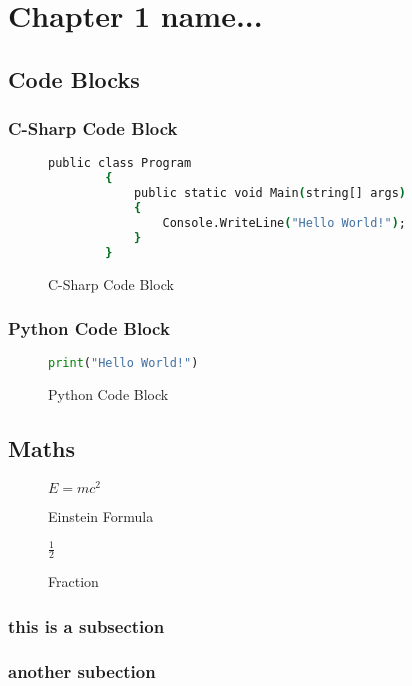 \chapter{Chapter 1 name...}


\section{Code Blocks}

\subsection{C-Sharp Code Block}

\begin{figure}[ht]
    \centering
    \begin{lstlisting}[language=csh]
        public class Program
        {
            public static void Main(string[] args)
            {
                Console.WriteLine("Hello World!");
            }
        }
    \end{lstlisting}
    \caption{C-Sharp Code Block}
    \label{fig:CSharpCodeBlock}
\end{figure}

\subsection{Python Code Block}

\begin{figure}[ht]
    \centering
    \begin{lstlisting}[language=python]
        print("Hello World!")
    \end{lstlisting}
    \caption{Python Code Block}
    \label{fig:PythonCodeBlock}
\end{figure}



\newpage


\section{Maths}

\begin{figure}[ht]
    \centering
    \begin{math}
        E=mc^2 
    \end{math}
    \caption{Einstein Formula}
    \label{fig:Emc2}

\end{figure}

\begin{figure}[ht]
    \centering
    \begin{math}
        \frac{1}{2} 
    \end{math}
    \caption{Fraction}
    \label{fig:Fraction 1}

\end{figure}

\subsection{this is a subsection}

\lipsum[7-8]

\subsection{another subection}

\lipsum[4-6]
